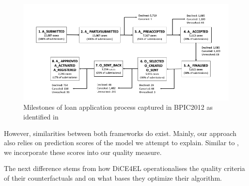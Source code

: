 \documentclass[./../../paper.tex]{subfiles}
\begin{document}
\begin{figure}[htbp]
    \centering
    \includegraphics[width=\textwidth]{figures/milestones.png}
    \caption{Milestones of loan application process captured in BPIC2012 as
    identified in \autocite{bautista_ProcessMiningDrivenOptimization_2012}}
    \label{fig:milestones}
\end{figure}

However, similarities between both frameworks do exist. Mainly, our approach also relies on prediction scores of the model we attempt to explain. Similar to \citeauthor{hsieh_DiCE4ELInterpretingProcess_2021}, we incorporate these scores into our quality measure. 

The next difference stems from how DiCE4EL operationalises the quality criteria of their counterfactuals and on what bases they optimize their algorithm. 
\end{document}
